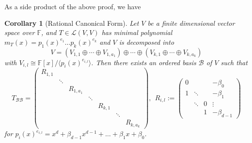 \documentclass[11pt,openany]{book}
\theoremstyle{plain}
\newtheorem{corollary}[corollary]{Corollary}
\theoremstyle{definition}
\theoremstyle{remark}
\begin{document}
As a side product of the above proof, we have
\begin{corollary}[Rational Canonical Form] \label{cor-rcf}
Let $V$ be a finite dimensional vector space over $\mathbb{F}$, and $T \in \mathcal{L}(V,V)$ has minimal polynomial $m_T(x) = p_1(x)^{e_1} \dots p_k(x)^{e_k}$ and $V$ is decomposed into
$$V = (V_{1,1} \oplus \cdots \oplus V_{1,a_1}) \oplus \cdots \oplus (V_{k,1} \oplus \cdots \oplus V_{k,a_k})$$
with $V_{i,l} \cong \mathbb{F}[x]/\langle p_i(x)^{e_{i,l}} \rangle$. Then there exists an ordered basis $\mathcal{B}$ of $V$ such that 
    $$T_{\mathcal{B}\mathcal{B}} = \begin{pmatrix} R_{1,1} & & & & & \\
& \ddots & & & & & \\ 
& & R_{1,a_1} & & & & \\
& & & \ddots & & &\\
& & & & R_{k,1} & & \\
& & & & & \ddots & \\
& & & & & & R_{k,a_k}\end{pmatrix},\ \ R_{i,l} := \begin{pmatrix}
    0 &  &  &  -\beta_0 \\
    1 & \ddots     & &   -\beta_1 \\
    & \ddots & 0 &  \vdots \\ 
     &  & 1 & -\beta_{d-1}
\end{pmatrix}
$$
for $p_i(x)^{e_{i,l}} = x^d + \beta_{d-1}x^{d-1}+ \dots + \beta_1 x + \beta_0$.
\end{corollary}
\end{document}
